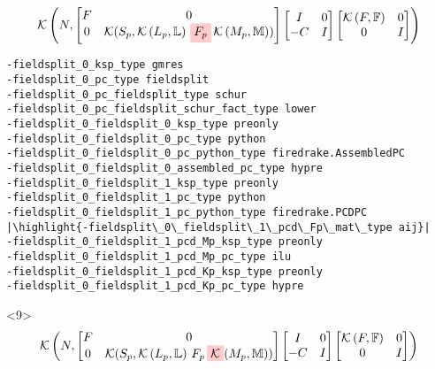 \documentclass[presentation]{beamer}
\newcommand{\KSP}[2]{\ensuremath{\mathcal{K}\left(#1, \mathbb{#2}\right)}}
\newcommand{\ksp}[1]{\KSP{#1}{#1}}
\newcommand{\highlight}[1]{\colorbox{red!20}{\color{black} #1}}
\begin{document}
\begin{frame}[fragile]
\begin{onlyenv}
    \begin{equation*}
      \KSP{N}{%
        \begin{bmatrix}
        F & 0 \\
        0 & \mathcal{K}(S_p, \KSP{L_p}{L}\,\highlight{$F_p$} \, \KSP{M_p}{M})
      \end{bmatrix}
      \begin{bmatrix}
        I & 0\\
        -C & I
      \end{bmatrix}
      \begin{bmatrix}
        \ksp{F} & 0 \\
        0 & I
      \end{bmatrix}}
    \end{equation*}
\begin{verbatim}
-fieldsplit_0_ksp_type gmres
-fieldsplit_0_pc_type fieldsplit
-fieldsplit_0_pc_fieldsplit_type schur
-fieldsplit_0_pc_fieldsplit_schur_fact_type lower
-fieldsplit_0_fieldsplit_0_ksp_type preonly
-fieldsplit_0_fieldsplit_0_pc_type python
-fieldsplit_0_fieldsplit_0_pc_python_type firedrake.AssembledPC
-fieldsplit_0_fieldsplit_0_assembled_pc_type hypre
-fieldsplit_0_fieldsplit_1_ksp_type preonly
-fieldsplit_0_fieldsplit_1_pc_type python
-fieldsplit_0_fieldsplit_1_pc_python_type firedrake.PCDPC
|\highlight{-fieldsplit\_0\_fieldsplit\_1\_pcd\_Fp\_mat\_type aij}|
-fieldsplit_0_fieldsplit_1_pcd_Mp_ksp_type preonly
-fieldsplit_0_fieldsplit_1_pcd_Mp_pc_type ilu
-fieldsplit_0_fieldsplit_1_pcd_Kp_ksp_type preonly
-fieldsplit_0_fieldsplit_1_pcd_Kp_pc_type hypre
\end{verbatim}
  \end{onlyenv}
  \begin{onlyenv}<9>
    \color{gray}
    \begin{equation*}
      \KSP{N}{%
      \begin{bmatrix}
        F & 0 \\
        0 & \mathcal{K}(S_p, \KSP{L_p}{L}\,F_p \, \highlight{$\mathcal{K}$}(M_p, \mathbb{M}))
      \end{bmatrix}
      \begin{bmatrix}
        I & 0\\
        -C & I
      \end{bmatrix}
      \begin{bmatrix}
        \ksp{F} & 0 \\
        0 & I
      \end{bmatrix}}
    \end{equation*}

\end{onlyenv}
\end{frame}
\end{document}
